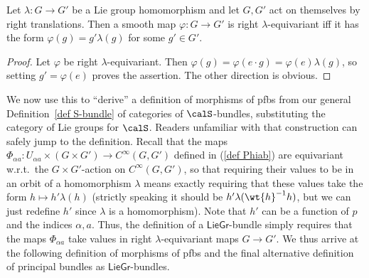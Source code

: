 \begin{prop}
    Let $\lambda:G\to G'$ be a Lie group homomorphism and let $G,G'$ act on themselves by right translations. Then a smooth map $\varphi:G\to G'$ is right $\lambda$-equivariant iff it has the form $\varphi(g)=g'\lambda(g)$ for some $g'\in G'$.
\end{prop}
\begin{proof}
    Let $\varphi$ be right $\lambda$-equivariant. Then
    $\varphi(g)=\varphi(e\cdot g)=\varphi(e)\lambda(g)$,
    so setting $g'=\varphi(e)$ proves the assertion. The other direction is obvious.
\end{proof}

We now use this to ``derive'' a definition of morphisms of \glspl{pfb} from our general Definition~\ref{def S-bundle} of categories of $\calS$-bundles, substituting the category of Lie groups for $\calS$. Readers unfamiliar with that construction can safely jump to the definition. Recall that the maps $\Phi_{\alpha a}:U_{\alpha a}\times (G\times G')\to C^\infty(G,G')$ defined in (\ref{def Phiab}) are equivariant w.r.t.\ the $G\times G'$-action on $C^\infty(G,G')$, so that requiring their values to be in an orbit of a homomorphism $\lambda$ means exactly requiring that these values take the form $h\mapsto h'\lambda (h)$ (strictly speaking it should be $h'\lambda(\wt{h}^{-1}h)$, but we can just redefine $h'$ since $\lambda$ is a homomorphism). Note that $h'$ can be a function of $p$ and the indices $\alpha,a$. Thus, the definition of a $\mathsf{LieGr}$-bundle simply requires that the maps $\Phi_{\alpha a}$ take values in right $\lambda$-equivariant maps $G\to G'$. We thus arrive at the following definition of morphisms of \glspl{pfb} and the final alternative definition of principal bundles as $\mathsf{LieGr}$-bundles.



